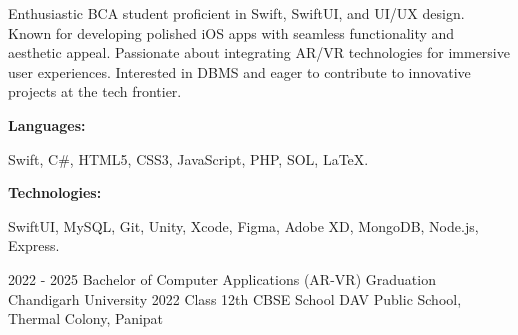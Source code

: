 \documentclass[9pt]{developercv} %
\begin{document}
\begin{minipage}[t]{0.46\textwidth}
	\vspace{-6pt}
 
    Enthusiastic BCA student proficient in Swift, SwiftUI, and UI/UX design. Known for developing polished iOS apps with seamless functionality and aesthetic appeal. Passionate about integrating AR/VR technologies for immersive user experiences. Interested in DBMS and eager to contribute to innovative projects at the tech frontier.
\end{minipage}
\hfill %
\begin{minipage}[t]{0.465\textwidth}
    \vspace{-6pt}
    
    \begin{minipage}[t]{0.2\textwidth}
        \textbf{Languages:}
    \end{minipage}
    \hfill
    \begin{minipage}[t]{0.73\textwidth}
      Swift, C\#, HTML5, CSS3, JavaScript, PHP, SOL, LaTeX.  
    \end{minipage}
    \vspace{4mm}
    
    \begin{minipage}[t]{0.2\textwidth}
        \textbf{Technologies:}
    \end{minipage}
    \hfill
    \begin{minipage}[t]{0.73\textwidth}
      SwiftUI, MySQL, Git, Unity, Xcode, Figma, Adobe XD, MongoDB, Node.js, Express.
    \end{minipage}
    
\end{minipage}


\vspace{-5 pt}
\begin{entrylist}
    \entry
		{2022 - 2025}
		{Bachelor of Computer Applications (AR-VR)}
		{Graduation}
		{Chandigarh University}
    \entry
		{2022}
		{Class 12th CBSE }
		{School}
	 	{DAV Public School, Thermal Colony, Panipat}
\end{entrylist}
\end{document}
